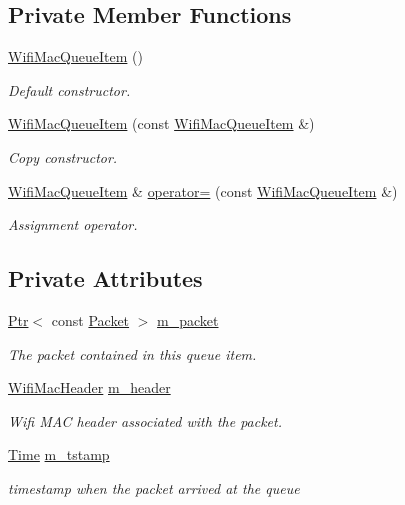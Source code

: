 \subsection*{Private Member Functions}
\begin{DoxyCompactItemize}
\item 
\hyperlink{classns3_1_1WifiMacQueueItem_a517325d31806c0cea95bcb89b3a42e4c}{Wifi\+Mac\+Queue\+Item} ()
\begin{DoxyCompactList}\small\item\em Default constructor. \end{DoxyCompactList}\item 
\hyperlink{classns3_1_1WifiMacQueueItem_abf2574bebb7c7a11ddbb30449da263b7}{Wifi\+Mac\+Queue\+Item} (const \hyperlink{classns3_1_1WifiMacQueueItem}{Wifi\+Mac\+Queue\+Item} \&)
\begin{DoxyCompactList}\small\item\em Copy constructor. \end{DoxyCompactList}\item 
\hyperlink{classns3_1_1WifiMacQueueItem}{Wifi\+Mac\+Queue\+Item} \& \hyperlink{classns3_1_1WifiMacQueueItem_ae9aa05bf387df722caca54393637ef66}{operator=} (const \hyperlink{classns3_1_1WifiMacQueueItem}{Wifi\+Mac\+Queue\+Item} \&)
\begin{DoxyCompactList}\small\item\em Assignment operator. \end{DoxyCompactList}\end{DoxyCompactItemize}
\subsection*{Private Attributes}
\begin{DoxyCompactItemize}
\item 
\hyperlink{classns3_1_1Ptr}{Ptr}$<$ const \hyperlink{classns3_1_1Packet}{Packet} $>$ \hyperlink{classns3_1_1WifiMacQueueItem_adc532b8afa72978d472e31067773f7c7}{m\+\_\+packet}
\begin{DoxyCompactList}\small\item\em The packet contained in this queue item. \end{DoxyCompactList}\item 
\hyperlink{classns3_1_1WifiMacHeader}{Wifi\+Mac\+Header} \hyperlink{classns3_1_1WifiMacQueueItem_af8c0b06a77050edc77a561cac7e144d9}{m\+\_\+header}
\begin{DoxyCompactList}\small\item\em Wifi M\+AC header associated with the packet. \end{DoxyCompactList}\item 
\hyperlink{classns3_1_1Time}{Time} \hyperlink{classns3_1_1WifiMacQueueItem_abb20b7c4be728aee350cc5f2583cae97}{m\+\_\+tstamp}
\begin{DoxyCompactList}\small\item\em timestamp when the packet arrived at the queue \end{DoxyCompactList}\end{DoxyCompactItemize}
